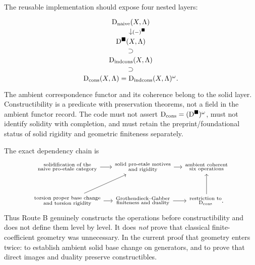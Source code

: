 \begin{formalization}
The reusable implementation should expose four nested layers:
\[
\begin{tikzcd}[row sep=small]
\Dnaive(X,\Lambda)
 \arrow[d,"(-)^{\blacksquare}"]\\
\Dsolid(X,\Lambda)
 \arrow[d,phantom,"\supset"]\\
\Dindcons(X,\Lambda)
 \arrow[d,phantom,"\supset"]\\
\Dcons(X,\Lambda)=\Dindcons(X,\Lambda)^\omega.
\end{tikzcd}
\]
The ambient correspondence functor and its coherence belong to the solid
layer.  Constructibility is a predicate with preservation theorems, not a
field in the ambient functor record.  The code must not assert
\(\mathrm D_{\mathrm{cons}}=(\mathrm D^{\blacksquare})^\omega\), must not identify solidity with completion, and
must retain the preprint/foundational status of solid rigidity and geometric
finiteness separately.
\end{formalization}

\begin{auditbox}[title={Final Route B dependency audit}]
The exact dependency chain is
\[
\begin{tikzcd}[column sep=small,row sep=large]
\substack{\text{solidification of the}\\
          \text{naive pro-etale category}}
 \arrow[r] &
\substack{\text{solid pro-etale motives}\\
          \text{and rigidity}}
 \arrow[r] &
\substack{\text{ambient coherent}\\
          \text{six operations}}\\
\substack{\text{torsion proper base change}\\
          \text{and torsion rigidity}}
 \arrow[ur] \arrow[r] &
\substack{\text{Grothendieck--Gabber}\\
          \text{finiteness and duality}}
 \arrow[r] &
\substack{\text{restriction to}\\
          \Dcons}
 \arrow[u].
\end{tikzcd}
\]
Thus Route B genuinely constructs the operations before constructibility and
does not define them level by level.  It does \emph{not} prove that classical
finite-coefficient geometry was unnecessary.  In the current proof that
geometry enters twice: to establish ambient solid base change on generators,
and to prove that direct images and duality preserve constructibles.
\end{auditbox}
